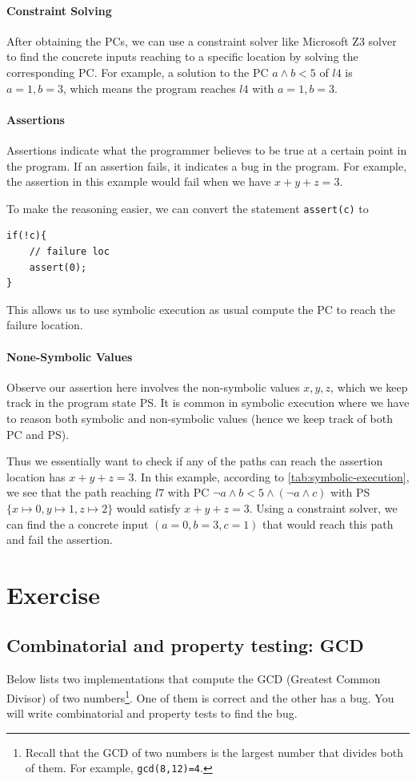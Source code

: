 \documentclass[oneside,11pt,dvipsnames]{book}
\newcommand{\code}[1]{\texttt{#1}}
\begin{document}
\paragraph{Constraint Solving} 
After obtaining the PCs, we can use a constraint solver like Microsoft Z3 solver to find the concrete inputs reaching to a specific location by solving the corresponding PC. For example, a solution to the PC $a \land b < 5$ of $l4$ is $a=1, b=3$, which means the program reaches $l4$ with $a=1, b=3$.

\paragraph{Assertions} Assertions indicate what the programmer believes to be true at a certain point in the program. If an assertion fails, it indicates a bug in the program. For example, the assertion in this example would fail when we have $x + y + z = 3$.

To make the reasoning easier, we can convert the statement \code{assert(c)} to 
\begin{lstlisting}
if(!c){
    // failure loc
    assert(0);
}
\end{lstlisting}

This allows us to use symbolic execution as usual compute the PC to reach the failure location. 

\paragraph{None-Symbolic Values} Observe our assertion here involves the non-symbolic values $x, y, z$, which we keep track in the program state PS. It is common in symbolic execution where we have to reason both symbolic and non-symbolic values (hence we keep track of both PC and PS).

Thus we essentially want to check if any of the paths can reach the assertion location has $x + y + z = 3$. In this example, according to \autoref{tab:symbolic-execution}, we see that the path reaching $l7$ with PC $\lnot a \land b < 5 \land (\lnot a \land c)$ with PS $\{x\mapsto 0, y \mapsto 1, z \mapsto2\}$ would satisfy $x + y + z = 3$. Using a constraint solver, we can find the a concrete input $(a=0, b=3, c = 1)$ that would reach this path and fail the assertion.


\section{Exercise}
\subsection{Combinatorial and property testing: GCD}
Below lists two implementations that compute the GCD (Greatest Common Divisor) of two numbers\footnote{Recall that the GCD of two numbers is the largest number that divides both of them. For example, \code{gcd(8,12)=4}.}. One of them is correct and the other has a bug.  You will write combinatorial and property tests to find the bug.  
\end{document}
